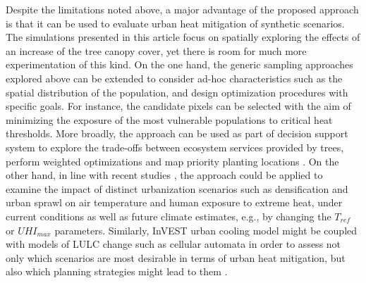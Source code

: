 \documentclass[10pt,letterpaper]{article}
\begin{document}
Despite the limitations noted above, a major advantage of the proposed approach is that it can be used to evaluate urban heat mitigation of synthetic scenarios.
The simulations presented in this article focus on spatially exploring the effects of an increase of the tree canopy cover, yet there is room for much more experimentation of this kind.
On the one hand, the generic sampling approaches explored above can be extended to consider ad-hoc characteristics such as the spatial distribution of the population, and design optimization procedures with specific goals. For instance, the candidate pixels can be selected with the aim of minimizing the exposure of the most vulnerable populations to critical heat thresholds.
More broadly, the approach can be used as part of decision support system to explore the trade-offs between ecosystem services provided by trees, perform weighted optimizations and map priority planting locations \cite{bodnaruk2017plant}.
On the other hand, in line with recent studies \cite{lemonsu2015vulnerability,yang2016contrasting,trimmel2019thermal}, the approach could be applied to examine the impact of distinct urbanization scenarios such as densification and urban sprawl on air temperature and human exposure to extreme heat, under current conditions as well as future climate estimates, e.g., by changing the $T_{ref}$ or $UHI_{max}$ parameters.
Similarly, InVEST urban cooling model might be coupled with models of LULC change such as cellular automata in order to assess not only which scenarios are most desirable in terms of urban heat mitigation, but also which planning strategies might lead to them \cite{silva2008strategies,white2015modeling,bosch2019addressing}.
\end{document}
